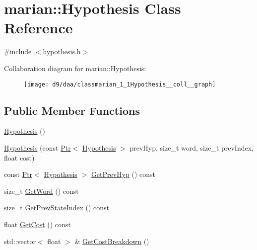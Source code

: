 \hypertarget{classmarian_1_1Hypothesis}{}\section{marian\+:\+:Hypothesis Class Reference}
\label{classmarian_1_1Hypothesis}


{\ttfamily \#include $<$hypothesis.\+h$>$}



Collaboration diagram for marian\+:\+:Hypothesis\+:
\nopagebreak
\begin{figure}[H]
\begin{center}
\leavevmode
\texttt{[image: d9/daa/classmarian\_1\_1Hypothesis\_\_coll\_\_graph]}
\end{center}
\end{figure}
\subsection*{Public Member Functions}
\begin{DoxyCompactItemize}
\item 
\hyperlink{classmarian_1_1Hypothesis_adcdc27d5062750a588b9f909b4d7a8b9}{Hypothesis} ()
\item 
\hyperlink{classmarian_1_1Hypothesis_a1ee83c959e3fa7e8e76d7ca234477e80}{Hypothesis} (const \hyperlink{namespacemarian_ad1a373be43a00ef9ce35666145137b08}{Ptr}$<$ \hyperlink{classmarian_1_1Hypothesis}{Hypothesis} $>$ prev\+Hyp, size\+\_\+t word, size\+\_\+t prev\+Index, float cost)
\item 
const \hyperlink{namespacemarian_ad1a373be43a00ef9ce35666145137b08}{Ptr}$<$ \hyperlink{classmarian_1_1Hypothesis}{Hypothesis} $>$ \hyperlink{classmarian_1_1Hypothesis_ab502e9a71c3f82598ce244720cafd5d1}{Get\+Prev\+Hyp} () const 
\item 
size\+\_\+t \hyperlink{classmarian_1_1Hypothesis_a9d1318d435dc2202447c06630efac473}{Get\+Word} () const 
\item 
size\+\_\+t \hyperlink{classmarian_1_1Hypothesis_a8b073015c20d5a76c286640977fad91e}{Get\+Prev\+State\+Index} () const 
\item 
float \hyperlink{classmarian_1_1Hypothesis_a9c7a517dfecb9aab1fed4471658a3af7}{Get\+Cost} () const 
\item 
std\+::vector$<$ float $>$ \& \hyperlink{classmarian_1_1Hypothesis_a50cf986260d0b079a52bb6efbcdba762}{Get\+Cost\+Breakdown} ()
\end{DoxyCompactItemize}
